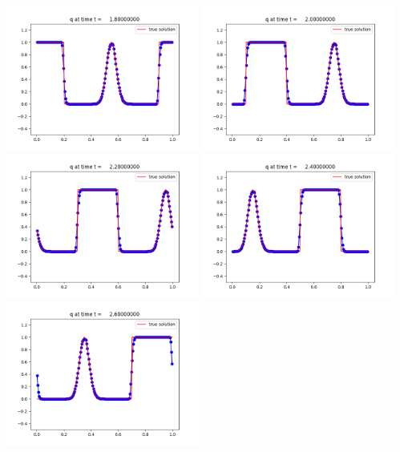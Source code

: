 \documentclass[11pt]{article}
\begin{document}
\vskip 10pt 
\includegraphics[width=0.475\textwidth]{frame0009fig1.png}
\vskip 10pt 
\includegraphics[width=0.475\textwidth]{frame0010fig1.png}
\vskip 10pt 
\includegraphics[width=0.475\textwidth]{frame0011fig1.png}
\vskip 10pt 
\includegraphics[width=0.475\textwidth]{frame0012fig1.png}
\vskip 10pt 
\includegraphics[width=0.475\textwidth]{frame0013fig1.png}
\end{document}

